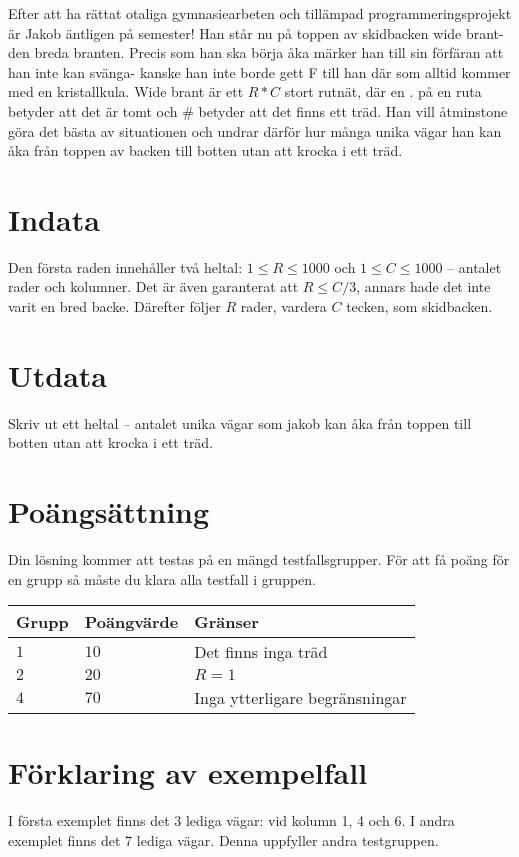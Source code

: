 Efter att ha rättat otaliga gymnasiearbeten och tillämpad programmeringsprojekt är Jakob äntligen på semester! Han står nu på toppen av skidbacken wide brant- den breda branten.
Precis som han ska börja åka märker han till sin förfäran att han inte kan svänga- kanske han inte borde gett F till han där som alltid kommer med en kristallkula.
Wide brant är ett $R*C$ stort rutnät, där en . på en ruta betyder att det är tomt och \# betyder att det finns ett träd. 
Han vill åtminstone göra det bästa av situationen och undrar därför hur många unika vägar han kan åka från toppen av backen till botten utan att krocka i ett träd.

\section*{Indata}
Den första raden innehåller två heltal: $1\leq R \leq 1000$ och $1 \leq C \leq 1000$ -- antalet rader och kolumner. Det är även garanterat att $R \leq C/3$, annars hade det inte varit en bred backe.
Därefter följer $R$ rader, vardera $C$ tecken, som skidbacken. 

\section*{Utdata}
Skriv ut ett heltal -- antalet unika vägar som jakob kan åka från toppen till botten utan att krocka i ett träd.

\section*{Poängsättning}
Din lösning kommer att testas på en mängd testfallsgrupper.
För att få poäng för en grupp så måste du klara alla testfall i gruppen.

\noindent
\begin{tabular}{| l | l | p{12cm} |}
  \hline
  Grupp & Poängvärde & Gränser \\ \hline
  $1$   & $10$       & Det finns inga träd \\ \hline
  $2$   & $20$       & $R=1$ \\ \hline
  $4$   & $70$       & Inga ytterligare begränsningar  \\ \hline
\end{tabular}

\section*{Förklaring av exempelfall}
I första exemplet finns det 3 lediga vägar: vid kolumn 1, 4 och 6.
I andra exemplet finns det 7 lediga vägar. Denna uppfyller andra testgruppen.
